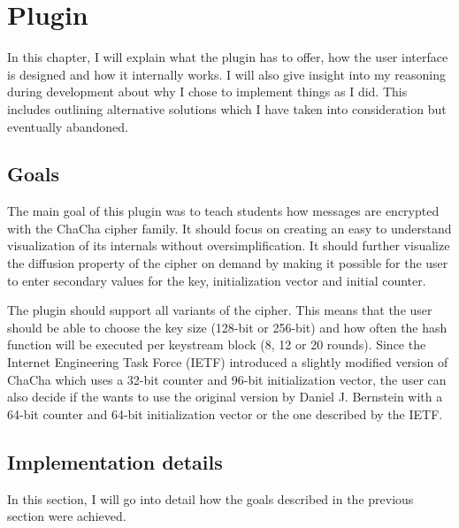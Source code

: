 %

\chapter{Plugin}
\label{chap:Plugin}

In this chapter, I will explain what the plugin has to offer, how the user interface is designed and how it internally works. I will also give insight into my reasoning during development about why I chose to implement things as I did. This includes outlining alternative solutions which I have taken into consideration but eventually abandoned.

\section{Goals}
\label{sec:goals}

The main goal of this plugin was to teach students how messages are encrypted with the ChaCha cipher family. It should focus on creating an easy to understand visualization of its internals without oversimplification.
It should further visualize the diffusion property of the cipher on demand by making it possible for the user to enter secondary values for the key, initialization vector and initial counter.

The plugin should support all variants of the cipher. This means that the user should be able to choose the key size (128-bit or 256-bit) and how often the hash function will be executed per keystream block (8, 12 or 20 rounds). 
Since the Internet Engineering Task Force (IETF) introduced a slightly modified version of ChaCha which uses a 32-bit counter and 96-bit initialization vector, the user can also decide if the wants to use the original version by Daniel J. Bernstein with a 64-bit counter and 64-bit initialization vector or the one described by the IETF.

\section{Implementation details}
\label{sec:implementationDetails}

In this section, I will go into detail how the goals described in the previous section were achieved.

\par


